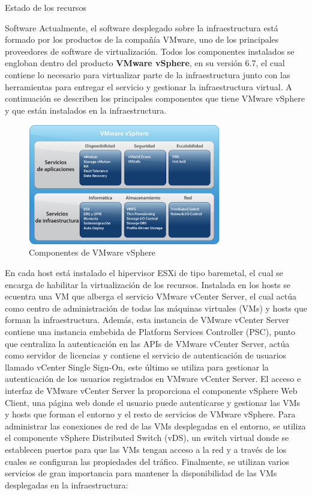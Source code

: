 \begin{chapter}{Estado de los recursos}
\begin{section}{Software}
    \label{subsec:softwareinstalado}
    Actualmente, el software desplegado sobre la infraestructura está formado por los productos de la compañía VMware, uno de los principales proveedores de software de virtualización. Todos los componentes instalados se engloban dentro del producto \textbf{VMware vSphere}, en su versión 6.7, el cual contiene lo necesario para virtualizar parte de la infraestructura junto con las herramientas para entregar el servicio y gestionar la infraestructura virtual. A continuación	se describen los principales componentes que tiene VMware vSphere y que están instalados en la infraestructura.
    \begin{figure}[h]
        \centering
        \includegraphics[width=0.75\textwidth]{imaxes/cap2recursos/contentVSphere}
        \caption{Componentes de VMware vSphere\cite{fotovSphere}}
        \label{fig:vSphere-components}
    \end{figure}
    \FloatBarrier
    En cada host está instalado el hipervisor ESXi de tipo baremetal, el cual se encarga de habilitar la virtualización de los recursos. Instalada en los hosts se ecuentra una VM que alberga el servicio VMware vCenter Server, el cual actúa como centro de administración de todas las máquinas virtuales (VMs) y hosts que forman la infraestructura. Además, esta instancia de VMware vCenter Server contiene una instancia embebida de Platform Services Controller (PSC), punto que centraliza la autenticación en las APIs de VMware vCenter Server, actúa como servidor de licencias y contiene el servicio de autenticación de usuarios llamado vCenter Single Sign-On, este último se utiliza para gestionar la autenticación de los usuarios registrados en VMware vCenter Server. El acceso e interfaz de VMware vCenter Server la proporciona el componente vSphere Web Client, una página web donde el usuario puede autenticarse y gestionar las VMs y hosts que forman el entorno y el resto de servicios de VMware vSphere. Para administrar las conexiones de red de las VMs desplegadas en el entorno, se utiliza el componente vSphere Distributed Switch (vDS), un switch virtual donde se establecen puertos para que las VMs tengan acceso a la red y a través de los cuales se configuran las propiedades del tráfico. Finalmente, se utilizan varios servicios de gran importancia para mantener la disponibilidad de las VMs desplegadas en la infraestructura:

\end{section}
\end{chapter}
